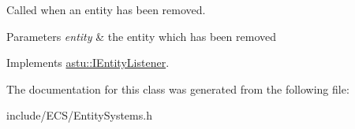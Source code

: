 Called when an entity has been removed.


\begin{DoxyParams}{Parameters}
{\em entity} & the entity which has been removed \\
\hline
\end{DoxyParams}


Implements \hyperlink{classastu_1_1IEntityListener_ab3d5a276da5e42cc4831e747fdf11718}{astu\+::\+I\+Entity\+Listener}.



The documentation for this class was generated from the following file\+:\begin{DoxyCompactItemize}
\item 
include/\+E\+C\+S/Entity\+Systems.\+h\end{DoxyCompactItemize}
